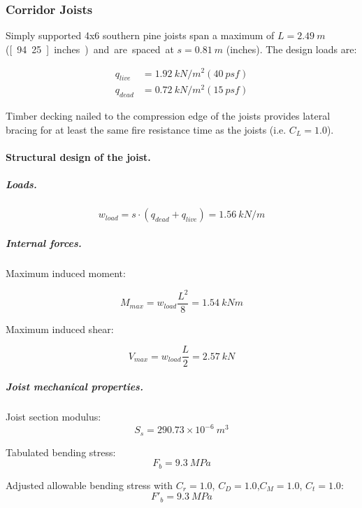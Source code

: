 \subsubsection{Corridor Joists}
Simply supported 4x6 southern pine joists span a maximum of $L= 2.49\ m$ (\unit[94.25]{inches}) and are spaced at $s= 0.81\ m$ (\unit[32]{inches}). The design loads are:

\begin{align}
  q_{live}&= 1.92\ kN/m^2 (40\ psf) \\
  q_{dead}&= 0.72\ kN/m^2 (15\ psf)
\end{align}

Timber decking nailed to the compression edge of the joists provides lateral bracing for at least the same fire resistance time as the joists (i.e. $C_L= 1.0$).

\paragraph{Structural design of the joist.}

\subparagraph{Loads.}

\begin{equation}
  w_{load}= s \cdot (q_{dead}+q_{live})= 1.56\ kN/m
\end{equation}

\subparagraph{Internal forces.}

\noindent Maximum induced moment:

\begin{equation}
  M_{max}= w_{load} \frac{L^2}{8}= 1.54\ kN m
\end{equation}

\noindent Maximum induced shear:

\begin{equation}
  V_{max}= w_{load} \frac{L}{2}= 2.57\ kN
\end{equation}

\subparagraph{Joist mechanical properties.}

\noindent Joist section modulus:
\begin{equation}
  S_s= 290.73 \times 10^{-6}\ m^3
\end{equation}

\noindent Tabulated bending stress:
\begin{equation}
  F_b= 9.3\ MPa
\end{equation}


\noindent Adjusted allowable bending stress with $C_r= 1.0$, $C_D= 1.0$,$C_M= 1.0$, $C_t= 1.0$:
\begin{equation}
  F'_b= 9.3\ MPa
\end{equation}

